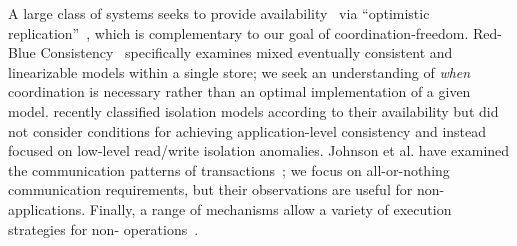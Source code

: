  A large class of systems
seeks to provide availability~\cite{gilbert-cap} via ``optimistic
replication''~\cite{optimistic}, which is complementary to our goal of
coordination-freedom. Red-Blue Consistency~\cite{redblue} specifically
examines mixed eventually consistent and linearizable models within a
single store; we seek an understanding of \textit{when} coordination
is necessary rather than an optimal implementation of a given
model. \cite{hat-vldb} recently classified isolation models according
to their availability but did not consider conditions for achieving
application-level consistency and instead focused on low-level
read/write isolation anomalies.  Johnson et al. have examined the
communication patterns of transactions~\cite{shore-communication}; we
focus on all-or-nothing communication requirements, but their
observations are useful for non-\iconfluent applications. Finally, a
range of mechanisms allow a variety of execution strategies for
non-\cfree
operations~\cite{silo,spanner,mdcc,bernstein-book,tamer-book,hstore,megastore}.

